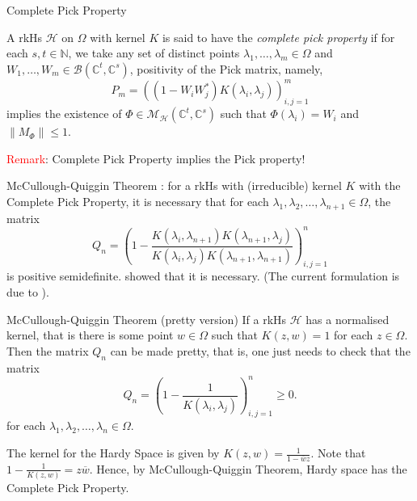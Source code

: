 \documentclass{beamer}
\newcommand{\N}{\mathbb N}
\newcommand{\C}{\mathbb C}
\renewcommand{\le}{\leqslant}
\renewcommand{\ge}{\geqslant}
\newcommand{\calB}{{\mathcal B}}
\newcommand{\calH}{{\mathcal H}}
\newcommand{\calM}{{\mathcal M}}
\newcommand{\norm}[1]{\left\lVert #1 \right\rVert}
\begin{document}
\begin{frame}{Complete Pick Property}
\begin{definition}
A rkHs $\calH$ on $\Omega$ with kernel $K$ is said to have the \textit{complete pick property} if for each $s,t \in \N$, we take any set of distinct points $\lambda_{1}, \ldots , \lambda_{m} \in \Omega$ and $W_{1}, \ldots , W_{m} \in \calB \left( \C ^{t}, \C^{s} \right)$, positivity of the Pick matrix, namely,
\begin{equation*}
P_{m} = \left( \left( 1-W_{i} W_{j}^{*} \right) K\left( \lambda_{i}, \lambda_{j} \right) \right)_{i,j=1}^{m}
\end{equation*}
implies the existence of $\Phi \in \calM_{\calH} \left( \C ^{t}, \C ^{s} \right)$ such that $\Phi \left( \lambda_{i} \right) = W_{i}$ and $\norm{M_{\Phi}} \le 1$.
\end{definition}
\pause

\textcolor{red}{Remark}: Complete Pick Property implies the Pick property!

\end{frame}

\begin{frame}{McCullough-Quiggin Theorem}
   \citeauthor{zbMATH00222166} : for a rkHs with (irreducible) kernel $K$ with the Complete Pick Property, it is necessary that for each $\lambda_{1}, \lambda_{2}, \ldots, \lambda_{n+1}\in \Omega$, the matrix
\begin{equation*}
Q_{n} = \left( 1-\frac{K\left( \lambda_{i}, \lambda_{n+1} \right)K\left( \lambda_{n+1}, \lambda_{j} \right)}{K\left( \lambda_{i}, \lambda_{j} \right) K\left( \lambda_{n+1}, \lambda_{n+1} \right)} \right)_{i,j=1}^{n}
\end{equation*}
is positive semidefinite. 
\citeauthor{MR1284929} showed that it is necessary. (The current formulation is due to \citeauthor{MR1774853} ).
\end{frame}

\begin{frame}{McCullough-Quiggin Theorem (pretty version)}
   If a rkHs $\calH$ has a normalised kernel, that is there is some point $w \in \Omega$ such that $K \left( z,w \right) = 1$ for each $z \in \Omega$. Then the matrix $Q_{n}$ can be made pretty, that is, one just needs to check that the matrix
\begin{equation*}
   Q_{n} = \left( 1-\frac{1}{K\left( \lambda_{i}, \lambda_{j} \right)} \right)_{i,j=1}^{n} \ge 0.
\end{equation*}
for each $\lambda_{1}, \lambda_{2}, \ldots, \lambda_{n}\in \Omega$.
\pause
\begin{example}
    The kernel for the Hardy Space is given by $K\left( z,w \right)= \frac{1}{1-\overline{w}z}$. Note that $1-\frac{1}{K\left( z,w \right)} = z \overline{w}$. Hence, by McCullough-Quiggin Theorem, Hardy space has the Complete Pick Property.
\end{example}
\end{frame}
\end{document}
